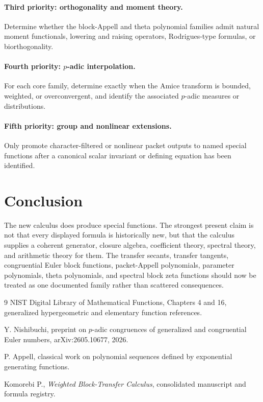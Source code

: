 \documentclass[11pt]{article}
\theoremstyle{definition}
\theoremstyle{remark}
\begin{document}
\paragraph{Third priority: orthogonality and moment theory.}
Determine whether the block-Appell and theta polynomial families admit natural moment functionals, lowering and raising operators, Rodrigues-type formulas, or biorthogonality.

\paragraph{Fourth priority: $p$-adic interpolation.}
For each core family, determine exactly when the Amice transform is bounded, weighted, or overconvergent, and identify the associated $p$-adic measures or distributions.

\paragraph{Fifth priority: group and nonlinear extensions.}
Only promote character-filtered or nonlinear packet outputs to named special functions after a canonical scalar invariant or defining equation has been identified.

\section*{Conclusion}

The new calculus does produce special functions.  The strongest present claim is not that every displayed formula is historically new, but that the calculus supplies a coherent generator, closure algebra, coefficient theory, spectral theory, and arithmetic theory for them.  The transfer secants, transfer tangents, congruential Euler block functions, packet-Appell polynomials, parameter polynomials, theta polynomials, and spectral block zeta functions should now be treated as one documented family rather than scattered consequences.

\begin{thebibliography}{9}
NIST Digital Library of Mathematical Functions, Chapters 4 and 16, generalized hypergeometric and elementary function references.

Y. Nishibuchi, preprint on $p$-adic congruences of generalized and congruential Euler numbers, arXiv:2605.10677, 2026.

P. Appell, classical work on polynomial sequences defined by exponential generating functions.

Komorebi P., \emph{Weighted Block-Transfer Calculus}, consolidated manuscript and formula registry.
\end{thebibliography}
\end{document}
